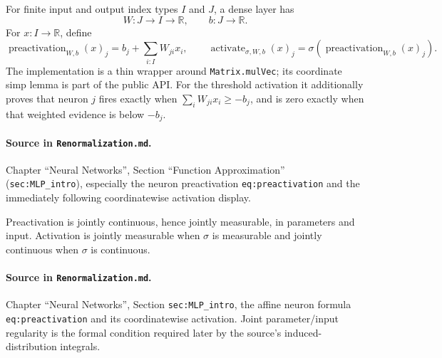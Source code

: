 \begin{definition}
\label{def:renorm:denseLayer}
For finite input and output index types $I$ and $J$, a dense layer has
\[
  W:J\to I\to\mathbb R,\qquad b:J\to\mathbb R.
\]
For $x:I\to\mathbb R$, define
\[
  \operatorname{preactivation}_{W,b}(x)_j
    =b_j+\sum_{i:I}W_{ji}x_i,
  \qquad
  \operatorname{activate}_{\sigma,W,b}(x)_j
    =\sigma(\operatorname{preactivation}_{W,b}(x)_j).
\]
The implementation is a thin wrapper around \texttt{Matrix.mulVec}; its coordinate simp lemma is
part of the public API.  For the threshold activation it additionally proves that neuron $j$ fires
exactly when $\sum_i W_{ji}x_i\ge -b_j$, and is zero exactly when that weighted evidence is below
$-b_j$.

\paragraph{Source in \texttt{Renormalization.md}.}
Chapter ``Neural Networks'', Section ``Function Approximation'' (\texttt{sec:MLP\_intro}), especially
the neuron preactivation \texttt{eq:preactivation} and the immediately following coordinatewise
activation display.
\end{definition}

\begin{lemma}
\label{lem:renorm:denseLayerRegularity}
Preactivation is jointly continuous, hence jointly measurable, in parameters and input.  Activation
is jointly measurable when $\sigma$ is measurable and jointly continuous when $\sigma$ is
continuous.

\paragraph{Source in \texttt{Renormalization.md}.}
Chapter ``Neural Networks'', Section \texttt{sec:MLP\_intro}, the affine neuron formula
\texttt{eq:preactivation} and its coordinatewise activation.  Joint parameter/input regularity is
the formal condition required later by the source's induced-distribution integrals.
\end{lemma}


